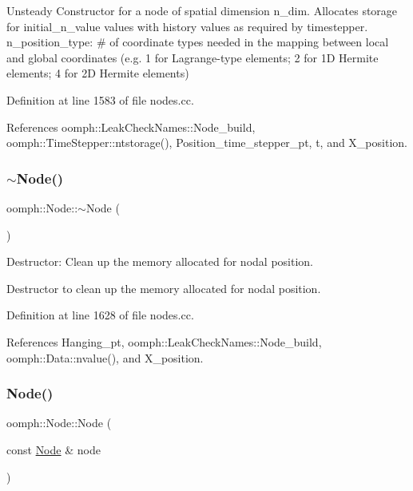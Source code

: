 Unsteady Constructor for a node of spatial dimension n\+\_\+dim. Allocates storage for initial\+\_\+n\+\_\+value values with history values as required by timestepper. n\+\_\+position\+\_\+type\+: \# of coordinate types needed in the mapping between local and global coordinates (e.\+g. 1 for Lagrange-\/type elements; 2 for 1D Hermite elements; 4 for 2D Hermite elements) 

Definition at line 1583 of file nodes.\+cc.



References oomph\+::\+Leak\+Check\+Names\+::\+Node\+\_\+build, oomph\+::\+Time\+Stepper\+::ntstorage(), Position\+\_\+time\+\_\+stepper\+\_\+pt, t, and X\+\_\+position.

\mbox{\label{classoomph_1_1Node_afa67d364de717efb1bb8e2b61fc4a29f}} 
\subsubsection{\texorpdfstring{$\sim$\+Node()}{~Node()}}
{\footnotesize\ttfamily oomph\+::\+Node\+::$\sim$\+Node (\begin{DoxyParamCaption}{ }\end{DoxyParamCaption})\hspace{0.3cm}{\ttfamily [virtual]}}



Destructor\+: Clean up the memory allocated for nodal position. 

Destructor to clean up the memory allocated for nodal position. 

Definition at line 1628 of file nodes.\+cc.



References Hanging\+\_\+pt, oomph\+::\+Leak\+Check\+Names\+::\+Node\+\_\+build, oomph\+::\+Data\+::nvalue(), and X\+\_\+position.

\mbox{\label{classoomph_1_1Node_a86a9dce363f062e0215b63e0b86dec51}} 
\subsubsection{\texorpdfstring{Node()}{Node()}\hspace{0.1cm}{\footnotesize\ttfamily [4/4]}}
{\footnotesize\ttfamily oomph\+::\+Node\+::\+Node (\begin{DoxyParamCaption}\item[{const \hyperlink{classoomph_1_1Node}{Node} \&}]{node }\end{DoxyParamCaption})\hspace{0.3cm}{\ttfamily [inline]}}



